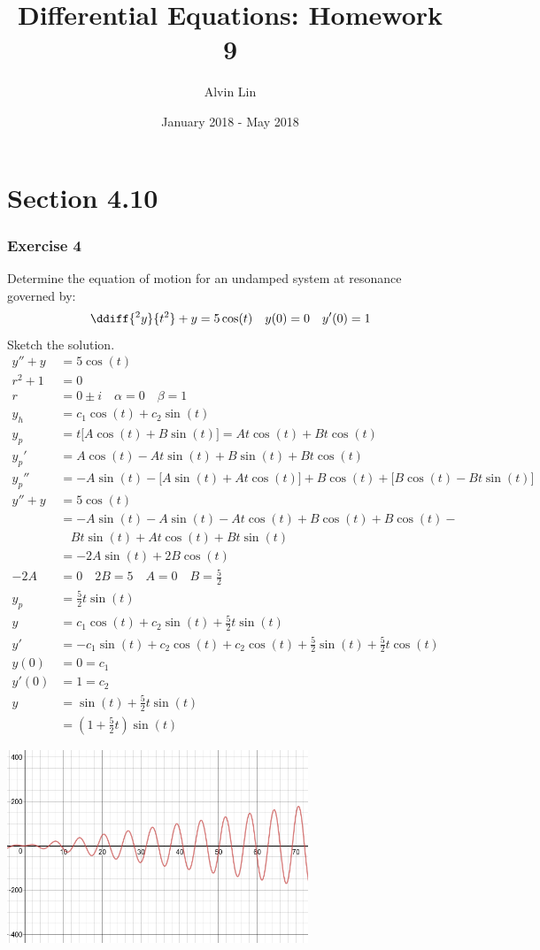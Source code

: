 \documentclass{math}
\title{Differential Equations: Homework 9}
\author{Alvin Lin}
\date{January 2018 - May 2018}
\begin{document}
\maketitle
\clearpage

\section*{Section 4.10}

\subsubsection*{Exercise 4}
Determine the equation of motion for an undamped system at resonance governed
by:
\[ \ddiff{^2y}{t^2}+y = 5\cos(t) \quad y(0) = 0 \quad y'(0) = 1 \]
Sketch the solution.
\begin{align*}
  y''+y &= 5\cos(t) \\
  r^2+1 &= 0 \\
  r &= 0\pm i \quad \alpha = 0 \quad \beta = 1 \\
  y_h &= c_1\cos(t)+c_2\sin(t) \\
  y_p &= t\bigg[A\cos(t)+B\sin(t)\bigg] = At\cos(t)+Bt\cos(t) \\
  y_p' &= A\cos(t)-At\sin(t)+B\sin(t)+Bt\cos(t) \\
  y_p'' &= -A\sin(t)-\bigg[A\sin(t)+At\cos(t)\bigg]+
    B\cos(t)+\bigg[B\cos(t)-Bt\sin(t)\bigg] \\
  y''+y &= 5\cos(t) \\
  &= -A\sin(t)-A\sin(t)-At\cos(t)+B\cos(t)+B\cos(t)- \\
  &~~~~ Bt\sin(t)+At\cos(t)+Bt\sin(t) \\
  &= -2A\sin(t)+2B\cos(t) \\
  -2A &= 0 \quad 2B = 5 \quad A = 0 \quad B = \frac{5}{2} \\
  y_p &= \frac{5}{2}t\sin(t) \\
  y &= c_1\cos(t)+c_2\sin(t)+\frac{5}{2}t\sin(t) \\
  y' &=
    -c_1\sin(t)+c_2\cos(t)+c_2\cos(t)+\frac{5}{2}\sin(t)+\frac{5}{2}t\cos(t) \\
  y(0) &= 0 = c_1 \\
  y'(0) &= 1 = c_2 \\
  y &= \sin(t)+\frac{5}{2}t\sin(t) \\
  &= (1+\frac{5}{2}t)\sin(t)
\end{align*}
\begin{center}
  \includegraphics[width=9cm]{assets/hw_09_04.png}
\end{center}
\end{document}
